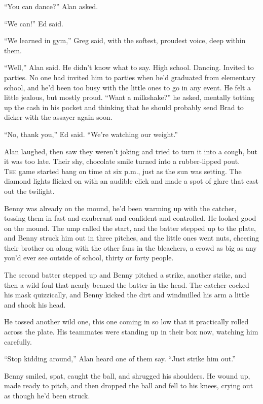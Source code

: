 ``You can dance?'' Alan asked.

``We can!'' Ed said.

``We learned in gym,'' Greg said, with the softest, proudest voice,
deep within them.

``Well,'' Alan said.  He didn't know what to say.  High school. 
Dancing.  Invited to parties.  No one had invited him to parties when
he'd graduated from elementary school, and he'd been too busy with the
little ones to go in any event.  He felt a little jealous, but mostly
proud.  ``Want a milkshake?'' he asked, mentally totting up the cash
in his pocket and thinking that he should probably send Brad to dicker
with the assayer again soon.

``No, thank you,'' Ed said.  ``We're watching our weight.''

Alan laughed, then saw they weren't joking and tried to turn it into a
cough, but it was too late.  Their shy, chocolate smile turned into a
rubber-lipped pout.
\\
\lettrine[lines=3, lhang=.5, nindent=0pt, findent=2pt]{T}{he} game started bang on time at six p.m., just as the sun was
setting.  The diamond lights flicked on with an audible click and made
a spot of glare that cast out the twilight.

Benny was already on the mound, he'd been warming up with the catcher,
tossing them in fast and exuberant and confident and controlled.  He
looked good on the mound.  The ump called the start, and the batter
stepped up to the plate, and Benny struck him out in three pitches,
and the little ones went nuts, cheering their brother on along with
the other fans in the bleachers, a crowd as big as any you'd ever see
outside of school, thirty or forty people.

The second batter stepped up and Benny pitched a strike, another
strike, and then a wild foul that nearly beaned the batter in the
head.  The catcher cocked his mask quizzically, and Benny kicked the
dirt and windmilled his arm a little and shook his head.

He tossed another wild one, this one coming in so low that it
practically rolled across the plate.  His teammates were standing up
in their box now, watching him carefully.

``Stop kidding around,'' Alan heard one of them say.  ``Just strike
him out.''

Benny smiled, spat, caught the ball, and shrugged his shoulders.  He
wound up, made ready to pitch, and then dropped the ball and fell to
his knees, crying out as though he'd been struck.

